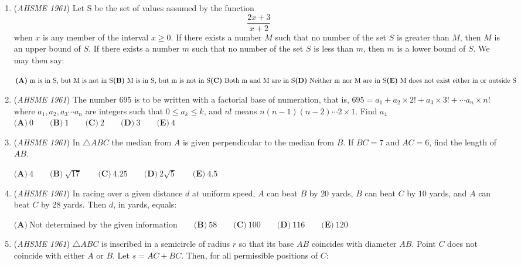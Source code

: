 \begin{enumerate}
	\item (\textit{AHSME 1961}) Let S be the set of values assumed by the function 
 \[\frac{2x+3}{x+2}\]
when $x$ is any member of the interval $x \ge 0$. If there exists a number $M$ such that no number of the set $S$ is greater than $M$, 
then $M$ is an upper bound of $S$. If there exists a number $m$ such that no number of the set $S$ is less than $m$, 
then $m$ is a lower bound of $S$. We may then say:


 $\textbf{(A)}\ \text{m is in S, but M is not in S}\qquad\\ \textbf{(B)}\ \text{M is in S, but m is not in S}\qquad\\ \textbf{(C)}\ \text{Both m and M are in S}\qquad\\ \textbf{(D)}\ \text{Neither m nor M are in S}\qquad\\ \textbf{(E)}\ \text{M does not exist either in or outside S}$


	\item (\textit{AHSME 1961}) The number $695$ is to be written with a factorial base of numeration, that is, $695=a_1+a_2\times2!+a_3\times3!+ \cdots a_n \times n!$ 
where $a_1, a_2, a_3 \cdots a_n$ are integers such that $0 \le a_k \le k$, and $n!$ means $n(n-1)(n-2)\cdots2 \times 1$. Find $a_4$
$\textbf{(A)}\ 0\qquad \textbf{(B)}\ 1\qquad \textbf{(C)}\ 2\qquad \textbf{(D)}\ 3\qquad \textbf{(E)}\ 4$


	\item (\textit{AHSME 1961}) In $\triangle ABC$ the median from $A$ is given perpendicular to the median from $B$. If $BC=7$ and $AC=6$, find the length of $AB$. 


 $\textbf{(A)}\ 4\qquad \textbf{(B)}\ \sqrt{17} \qquad \textbf{(C)}\ 4.25\qquad \textbf{(D)}\ 2\sqrt{5} \qquad \textbf{(E)}\ 4.5$


	\item (\textit{AHSME 1961}) In racing over a given distance $d$ at uniform speed, $A$ can beat $B$ by $20$ yards, $B$ can beat $C$ by $10$ yards, 
and $A$ can beat $C$ by $28$ yards. Then $d$, in yards, equals:


 $\textbf{(A)}\ \text{Not determined by the given information}\qquad \textbf{(B)}\ 58\qquad \textbf{(C)}\ 100\qquad \textbf{(D)}\ 116\qquad \textbf{(E)}\ 120$


	\item (\textit{AHSME 1961}) $\triangle ABC$ is inscribed in a semicircle of radius $r$ so that its base $AB$ coincides with diameter $AB$. 
Point $C$ does not coincide with either $A$ or $B$. Let $s=AC+BC$. Then, for all permissible positions of $C$:



\end{enumerate}
